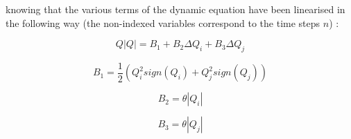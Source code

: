 \begin{itemize}
\vspace{0.5cm}

knowing that the various terms of the dynamic equation have been linearised in the following way (the non-indexed variables correspond to the time steps $n$) :

\begin{equation}
 Q |Q| = B_1 + B_2 \Delta Q_i + B_3 \Delta Q_j
\end{equation}

\begin{equation}
 B_1 = \frac{1}{2} ( Q_{i}^2 sign(Q_i) + Q_{j}^2 sign(Q_j) )
\end{equation}

\begin{equation}
 B_2 = \theta |Q_i|
\end{equation}

\begin{equation}
 B_3 = \theta |Q_j|
\end{equation}


\end{itemize}
